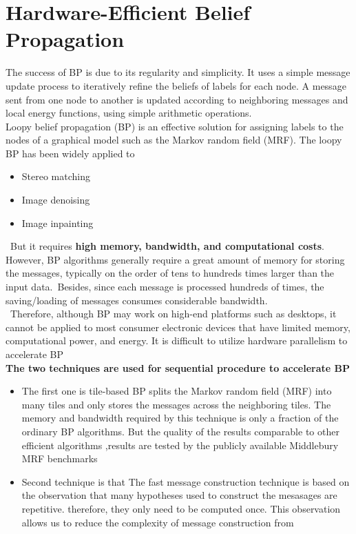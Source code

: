 \section{ Hardware-Efficient Belief Propagation}
The success of BP is due to its regularity and simplicity. It uses a simple message  update  process  to iteratively refine the  beliefs  of labels for each node. A message sent from one node to another is updated according to neighboring messages and local energy functions, using simple arithmetic operations.\\
Loopy belief  propagation (BP)  is  an  effective solution for  assigning labels to  the  nodes of  a  graphical model such as the Markov random field (MRF).
The loopy BP has been widely applied to

\begin{itemize}
  \item Stereo matching
  \item Image denoising
  \item Image inpainting
\end{itemize}
\ But it requires \textbf{high memory, bandwidth, and computational costs}.
\\However, BP algorithms generally require a great amount of memory for storing the messages, typically on the order of tens to hundreds times larger than the input data.\ Besides, since each message is processed hundreds of times, the saving/loading of  messages consumes considerable bandwidth.\\\ Therefore, although BP may work on high-end platforms such as desktops, it cannot be applied to most consumer electronic devices that have limited memory, computational power, and energy.
It  is  difficult to  utilize  hardware  parallelism  to accelerate BP 
\\\textbf{The  two techniques are used for sequential procedure to accelerate BP}
\begin{itemize}
  \item The first one is tile-based BP   splits the Markov random field (MRF) into many tiles and only stores the messages across the neighboring tiles. The memory and bandwidth required by this technique is only a fraction of the ordinary BP algorithms. But the quality of the results comparable to other efficient algorithms ,results are   tested by the publicly available Middlebury MRF benchmarks

  \item Second technique is that The fast message construction technique is based on the observation that many hypotheses used to construct the mesasages are repetitive. therefore, they only need to be computed once. This observation allows us to reduce the complexity of message construction from

\end{itemize}

